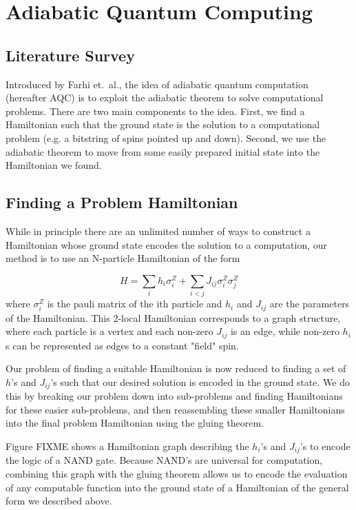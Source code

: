 \documentclass[12pt]{dalthesis}
\begin{document}
\chapter{Adiabatic Quantum Computing}
\section{Literature Survey}
Introduced by Farhi et.\ al.\cite{farhi}, the idea of adiabatic quantum computation (hereafter AQC) is to exploit the adiabatic theorem to solve computational problems.  There are two main components to the idea.  First, we find a Hamiltonian such that the ground state is the solution to a computational problem (e.g. a bitstring of spins pointed up and down).  Second, we use the adiabatic theorem to move from some easily prepared initial state into the Hamiltonian we found.

\section{Finding a Problem Hamiltonian}
While in principle there are an unlimited number of ways to construct a Hamiltonian whose ground state encodes the solution to a computation, our method is to use an N-particle Hamiltonian of the form

\begin{displaymath}
	H = \sum_{i} h_i \sigma_i^Z + \sum_{i < j} J_{ij} \sigma_i^Z\sigma_j^Z 
\end{displaymath}
where $\sigma_i^Z$ is the pauli matrix of the ith particle and $h_i$ and $J_{ij}$ are the parameters of the Hamiltonian.  This 2-local Hamiltonian corresponds to a graph structure, where each particle is a vertex and each non-zero $J_{ij}$ is an edge, while non-zero $h_i$s can be represented as edges to a constant "field" spin.

Our problem of finding a suitable Hamiltonian is now reduced to finding a set of $h$'s and $J_{ij}$'s such that our desired solution is encoded in the ground state.  We do this by breaking our problem down into sub-problems and finding Hamiltonians for these easier sub-problems, and then reassembling these smaller Hamiltonians into the final problem Hamiltonian using the gluing theorem.\cite{gluing}

Figure FIXME shows a Hamiltonian graph describing the $h_i$'s and $J_{ij}$'s to encode the logic of a NAND gate.  Because NAND's are universal for computation, combining this graph with the gluing theorem allows us to encode the evaluation of any computable function into the ground state of a Hamiltonian of the general form we described above.  
\end{document}
